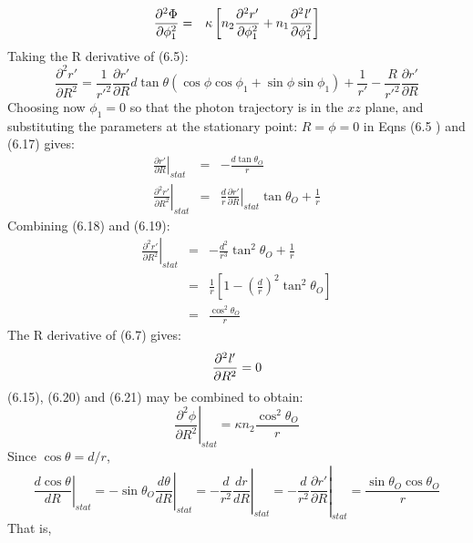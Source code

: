 \documentclass [12pt]{article}
\begin{document}
{\begin{eqnarray}
 \frac{\partial^2 \Phi}{\partial\phi_1^2} & = & \kappa \left[n_2  \frac{\partial^2 r'}{\partial \phi_1^2}
  + n_1  \frac{\partial^2 {\it l}'}{\partial \phi_1^2}\right]
\end{eqnarray}
 Taking the R derivative of (6.5):
  \begin{equation}
 \frac{\partial^2 r'}{\partial R^2} = \frac{1}{r'^2}\frac{\partial r'}{\partial R} d \tan \theta
 (\cos \phi \cos \phi_1+ \sin \phi \sin \phi_1)+\frac{1}{r'}-\frac{R}{r'^2}\frac{\partial r'}{\partial R}
 \end{equation}
 Choosing now $\phi_1 = 0$ so that the photon trajectory is in the $xz$ plane, and substituting the parameters
  at the stationary point: $R = \phi =0$ in Eqns (6.5 ) and (6.17) gives:  
\begin{eqnarray}
 \left.\frac{\partial r'}{\partial R}\right|_{stat} & = &   -\frac{d \tan \theta_O}{r} \\
 \left.\frac{\partial^2 r'}{\partial R^2}\right|_{stat} & = &  \frac{d}{r}
 \left.\frac{\partial r'}{\partial R} \right|_{stat}  \tan \theta_O + \frac{1}{r} 
\end{eqnarray}
Combining (6.18) and (6.19):
\begin{eqnarray}
 \left.\frac{\partial^2 r'}{\partial R^2}\right|_{stat} & = &  -\frac{d^2}{r^3}\tan^2 \theta_O
   + \frac{1}{r} \nonumber \\
 & = &  \frac{1}{r} \left[1- \left(\frac{d}{r}\right)^2 \tan^2 \theta_O \right] \nonumber \\
 & = &  \frac{\cos^2 \theta_O}{r}
\end{eqnarray}
 The R derivative of (6.7) gives:
 \begin{equation}
  \frac{\partial^2 {\it l}'}{\partial R^2} = 0 
 \end{equation}
 (6.15), (6.20) and (6.21) may be combined to obtain:
  \begin{equation}
 \left.  \frac{\partial^2 \phi}{\partial R^2} \right|_{stat} =
  \kappa n_2 \frac{\cos^2 \theta_O}{r}
 \end{equation}
 Since $\cos \theta = d/r$,
   \begin{equation}
  \left. \left. \left. \left.\frac{d \cos \theta}{d R}\right|_{stat} = -\sin  \theta_O 
   \frac{d \theta}{d R}\right|_{stat} = - \frac{d}{r^2}
  \frac{d  r}{d  R}\right|_{stat} =  - \frac{d}{r^2}\frac{\partial r'}{\partial R}\right|_{stat} 
    = \frac{\sin  \theta_O  \cos  \theta_O }{r}
 \end{equation}
  That is,
  \begin{equation}

\end{equation}}
\end{document}
